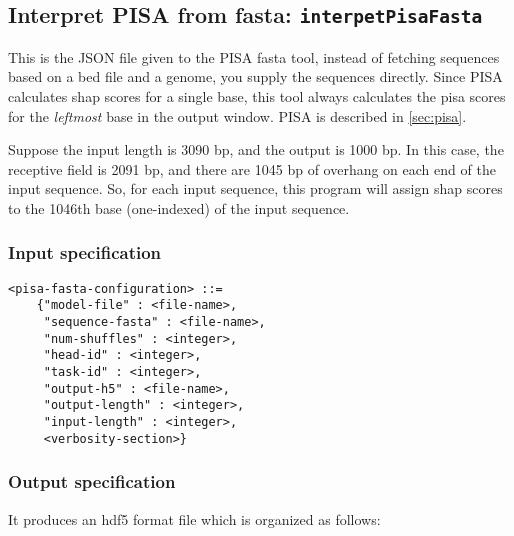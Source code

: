 \documentclass{article}
\begin{document}
\newpage

\subsection{Interpret PISA from fasta: \texttt{interpetPisaFasta}}\label{prog:interpretPisaFasta}

This is the JSON file given to the PISA fasta tool, instead of fetching sequences based on a bed
file and a genome, you supply the sequences directly.
Since PISA calculates shap scores for a single base, this tool always calculates the pisa scores
for the \emph{leftmost} base in the output window. PISA is described in \ref{sec:pisa}.

Suppose the input length is 3090 bp, and the output is 1000 bp.
In this case, the receptive field is 2091 bp, and there are 1045 bp of overhang on each end of
the input sequence.
So, for each input sequence, this program will assign shap scores to the 1046th base (one-indexed)
of the input sequence.

\subsubsection{Input specification}
\begin{lstlisting}
<pisa-fasta-configuration> ::=
    {"model-file" : <file-name>,
     "sequence-fasta" : <file-name>,
     "num-shuffles" : <integer>,
     "head-id" : <integer>,
     "task-id" : <integer>,
     "output-h5" : <file-name>,
     "output-length" : <integer>,
     "input-length" : <integer>,
     <verbosity-section>}
\end{lstlisting}

\subsubsection{Output specification}

It produces an hdf5 format file which is organized as follows:
\end{document}
